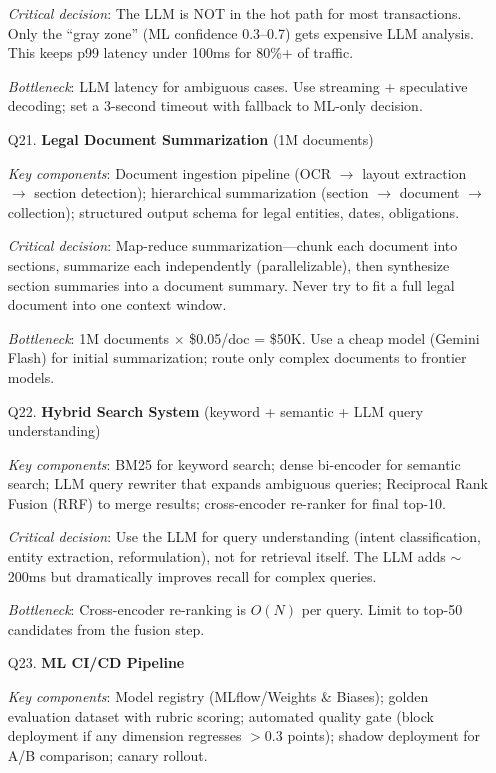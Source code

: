 \begin{enumerate}[leftmargin=*]
    \textit{Critical decision}: The LLM is NOT in the hot path for most transactions. Only the ``gray zone'' (ML confidence 0.3--0.7) gets expensive LLM analysis. This keeps p99 latency under 100ms for 80\%+ of traffic.

    \textit{Bottleneck}: LLM latency for ambiguous cases. Use streaming + speculative decoding; set a 3-second timeout with fallback to ML-only decision.

    \item[Q21.] \textbf{Legal Document Summarization} (1M documents)

    \textit{Key components}: Document ingestion pipeline (OCR $\to$ layout extraction $\to$ section detection); hierarchical summarization (section $\to$ document $\to$ collection); structured output schema for legal entities, dates, obligations.

    \textit{Critical decision}: Map-reduce summarization---chunk each document into sections, summarize each independently (parallelizable), then synthesize section summaries into a document summary. Never try to fit a full legal document into one context window.

    \textit{Bottleneck}: 1M documents $\times$ \$0.05/doc = \$50K. Use a cheap model (Gemini Flash) for initial summarization; route only complex documents to frontier models.

    \item[Q22.] \textbf{Hybrid Search System} (keyword + semantic + LLM query understanding)

    \textit{Key components}: BM25 for keyword search; dense bi-encoder for semantic search; LLM query rewriter that expands ambiguous queries; Reciprocal Rank Fusion (RRF) to merge results; cross-encoder re-ranker for final top-10.

    \textit{Critical decision}: Use the LLM for query understanding (intent classification, entity extraction, reformulation), not for retrieval itself. The LLM adds $\sim$200ms but dramatically improves recall for complex queries.

    \textit{Bottleneck}: Cross-encoder re-ranking is $O(N)$ per query. Limit to top-50 candidates from the fusion step.

    \item[Q23.] \textbf{ML CI/CD Pipeline}

    \textit{Key components}: Model registry (MLflow/Weights \& Biases); golden evaluation dataset with rubric scoring; automated quality gate (block deployment if any dimension regresses $>$0.3 points); shadow deployment for A/B comparison; canary rollout.


\end{enumerate}
